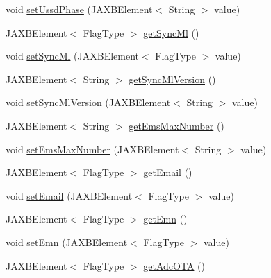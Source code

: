 \begin{DoxyCompactItemize}
void \hyperlink{classcom_1_1telefonica_1_1schemas_1_1unica_1_1rest_1_1directory_1_1v1_1_1UserTerminalInfoType_aaa45609ee1f23f19df9f8fe094cfd106}{setUssdPhase} (JAXBElement$<$ String $>$ value)
\item 
JAXBElement$<$ FlagType $>$ \hyperlink{classcom_1_1telefonica_1_1schemas_1_1unica_1_1rest_1_1directory_1_1v1_1_1UserTerminalInfoType_ae24b79b57f3780cfaed87c8ac40ecd9b}{getSyncMl} ()
\item 
void \hyperlink{classcom_1_1telefonica_1_1schemas_1_1unica_1_1rest_1_1directory_1_1v1_1_1UserTerminalInfoType_a4c85081e1865989fd1109e3ea324f6b3}{setSyncMl} (JAXBElement$<$ FlagType $>$ value)
\item 
JAXBElement$<$ String $>$ \hyperlink{classcom_1_1telefonica_1_1schemas_1_1unica_1_1rest_1_1directory_1_1v1_1_1UserTerminalInfoType_a9f414d9484fa1e4d7a09461a05f70bb4}{getSyncMlVersion} ()
\item 
void \hyperlink{classcom_1_1telefonica_1_1schemas_1_1unica_1_1rest_1_1directory_1_1v1_1_1UserTerminalInfoType_a1ddd459f7fef65b240d92fb749f89938}{setSyncMlVersion} (JAXBElement$<$ String $>$ value)
\item 
JAXBElement$<$ String $>$ \hyperlink{classcom_1_1telefonica_1_1schemas_1_1unica_1_1rest_1_1directory_1_1v1_1_1UserTerminalInfoType_a9c9626e7ca1ec8b1a5e4492c10a8b8a7}{getEmsMaxNumber} ()
\item 
void \hyperlink{classcom_1_1telefonica_1_1schemas_1_1unica_1_1rest_1_1directory_1_1v1_1_1UserTerminalInfoType_a31b83f5d7fca16c99a0179a23525498b}{setEmsMaxNumber} (JAXBElement$<$ String $>$ value)
\item 
JAXBElement$<$ FlagType $>$ \hyperlink{classcom_1_1telefonica_1_1schemas_1_1unica_1_1rest_1_1directory_1_1v1_1_1UserTerminalInfoType_aca289d3eccd647df758bb3fa978669cb}{getEmail} ()
\item 
void \hyperlink{classcom_1_1telefonica_1_1schemas_1_1unica_1_1rest_1_1directory_1_1v1_1_1UserTerminalInfoType_a2fb46d615333e8d8d708be227ad6c4f4}{setEmail} (JAXBElement$<$ FlagType $>$ value)
\item 
JAXBElement$<$ FlagType $>$ \hyperlink{classcom_1_1telefonica_1_1schemas_1_1unica_1_1rest_1_1directory_1_1v1_1_1UserTerminalInfoType_a1ba786c03ecc85d96fa5c915ad7bc4c5}{getEmn} ()
\item 
void \hyperlink{classcom_1_1telefonica_1_1schemas_1_1unica_1_1rest_1_1directory_1_1v1_1_1UserTerminalInfoType_a6846104839ca8ad1e8c3285977503bdc}{setEmn} (JAXBElement$<$ FlagType $>$ value)
\item 
JAXBElement$<$ FlagType $>$ \hyperlink{classcom_1_1telefonica_1_1schemas_1_1unica_1_1rest_1_1directory_1_1v1_1_1UserTerminalInfoType_ae9f30c95330d302690318bb6abb9d2c9}{getAdcOTA} ()

\end{DoxyCompactItemize}
